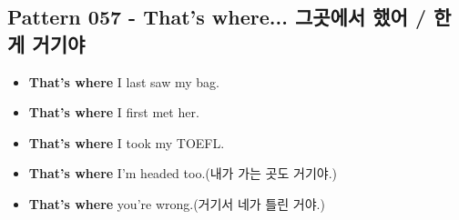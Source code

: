 \documentclass[11pt]{oblivoir}
\begin{document}
\subsection{Pattern 057 - That's where... 그곳에서 \texttildelow 했어 / \texttildelow 한 게 거기야}
\begin{itemize}
  \item \textbf{That's where} I last saw my bag.
  \item \textbf{That's where} I first met her.
  \item \textbf{That's where} I took my TOEFL.
  \item \textbf{That's where} I'm headed too.(내가 가는 곳도 거기야.)
  \item \textbf{That's where} you're wrong.(거기서 네가 틀린 거야.)
\end{itemize}
\end{document}
